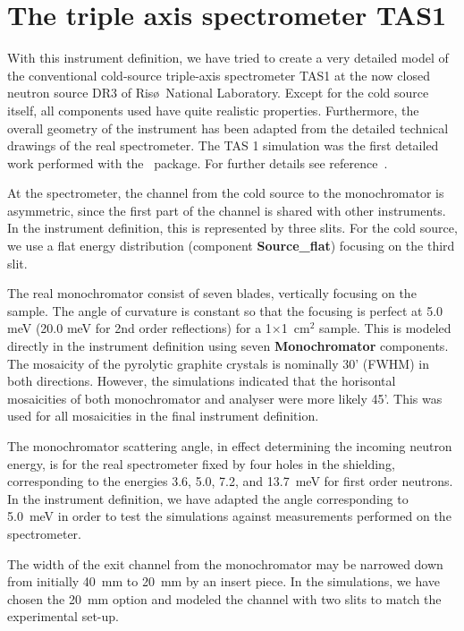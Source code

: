 \section{The triple axis spectrometer TAS1}
\label{s:TAS1}
With this instrument definition, we have tried to create
a very detailed model of the conventional cold-source
triple-axis spectrometer TAS1 at the now closed neutron source DR3 of
Ris\o\ National Laboratory.
Except for the cold source itself, all components
used have quite realistic properties. Furthermore, the overall
geometry of the instrument has been adapted from
the detailed technical drawings of the real spectrometer.
The TAS 1 simulation was the first detailed work
performed with the \MCS\ package.
For further details see reference~\cite{tas1_report}.

At the spectrometer, the channel from the cold source
to the monochromator is asymmetric, since the first
part of the channel is shared with other instruments.
In the instrument definition, this is represented by
three slits.
For the cold source, we use a flat energy
distribution (component {\bf Source\_flat})
focusing on the third slit.

The real monochromator consist of seven blades, vertically focusing on
the sample. The angle of curvature is constant so that the focusing is
perfect at 5.0 meV (20.0 meV for 2nd order reflections) for a 1$\times$1~cm$^2$
sample. This is modeled directly in the instrument definition using
seven {\bf Monochromator} components. The mosaicity of the pyrolytic
graphite crystals is nominally 30' (FWHM) in both directions.  However, the
simulations indicated that the horisontal mosaicities of both
monochromator and analyser were more likely 45'. This was used for all
mosaicities in the final instrument definition.

The monochromator scattering angle, in effect determining the incoming
neutron energy, is for the real spectrometer fixed by four holes in the
shielding, corresponding to the energies 3.6, 5.0, 7.2, and 13.7~meV for
first order neutrons.  In the instrument definition, we have adapted the
angle corresponding to 5.0~meV in order to test the simulations against
measurements performed on the spectrometer.

The width of the exit channel from the monochromator may
be narrowed down from initially 40~mm
to 20~mm by an insert piece. In the simulations, we have chosen
the 20~mm option and modeled the channel with two slits to match
the experimental set-up.

